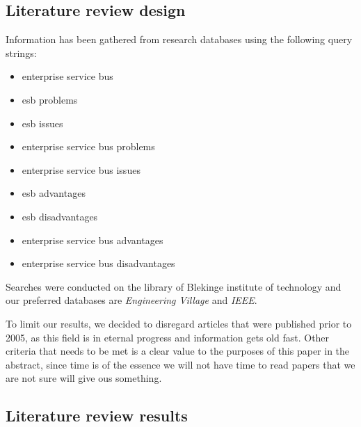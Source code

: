 \documentclass{llncs}
\begin{document}
\subsection{Literature review design}
Information has been gathered from research databases using the following query strings:
\begin{itemize}
\item enterprise service bus
\item esb problems
\item esb issues
\item enterprise service bus problems
\item enterprise service bus issues
\item esb advantages
\item esb disadvantages
\item enterprise service bus advantages
\item enterprise service bus disadvantages
\end{itemize}

Searches were conducted on the library of Blekinge institute of technology and our preferred databases are \emph{Engineering Village} and \emph{IEEE}.

To limit our results, we decided to disregard articles that were published prior to 2005, as this field is in eternal progress and information gets old fast.
Other criteria that needs to be met is a clear value to the purposes of this paper in the abstract, since time is of the essence we will not have time to read papers that we are not sure will give ous something.

\subsection{Literature review results}
\end{document}
